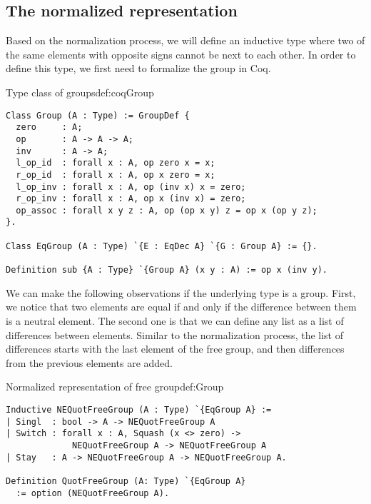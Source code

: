 \subsection{The normalized representation}
Based on the normalization process, we will define an inductive type where two of the same elements with opposite signs cannot be next to each other. In order to define this type, we first need to formalize the group in Coq.
\begin{defi}{Type class of groups}{def:coqGroup}
\begin{verbatim}
Class Group (A : Type) := GroupDef {
  zero     : A;
  op       : A -> A -> A;
  inv      : A -> A;
  l_op_id  : forall x : A, op zero x = x;
  r_op_id  : forall x : A, op x zero = x;
  l_op_inv : forall x : A, op (inv x) x = zero;
  r_op_inv : forall x : A, op x (inv x) = zero;
  op_assoc : forall x y z : A, op (op x y) z = op x (op y z);
}.

Class EqGroup (A : Type) `{E : EqDec A} `{G : Group A} := {}.

Definition sub {A : Type} `{Group A} (x y : A) := op x (inv y).
\end{verbatim}
\end{defi}
We can make the following observations if the underlying type is a group. First, we notice that two elements are equal if and only if the difference between them is a neutral element. The second one is that we can define any list as a list of differences between elements. Similar to the normalization process, the list of differences starts with the last element of the free group, and then differences from the previous elements are added.
\begin{defi}{Normalized representation of free group}{def:Group}
\begin{verbatim}
Inductive NEQuotFreeGroup (A : Type) `{EqGroup A} :=
| Singl  : bool -> A -> NEQuotFreeGroup A
| Switch : forall x : A, Squash (x <> zero) -> 
             NEQuotFreeGroup A -> NEQuotFreeGroup A
| Stay   : A -> NEQuotFreeGroup A -> NEQuotFreeGroup A.

Definition QuotFreeGroup (A: Type) `{EqGroup A} 
  := option (NEQuotFreeGroup A).
\end{verbatim}
\end{defi}

